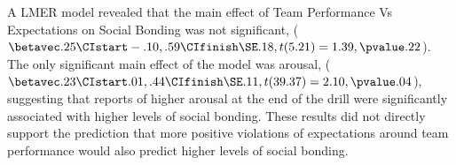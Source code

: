 \begin{CJK}{UTF8}{gbsn}

A LMER model revealed that the main effect of Team Performance Vs Expectations on Social Bonding was not significant, ($\betavec .25 \CIstart -.10, .59 \CIfinish \SE .18, t(5.21) = 1.39, \pvalue .22$).  The only significant main effect of the model was arousal, ($\betavec .23 \CIstart .01, .44 \CIfinish \SE .11, t(39.37) = 2.10, \pvalue .04$), suggesting that reports of higher arousal at the end of the drill were significantly associated with higher levels of social bonding.  These results did not directly support the prediction that more positive violations of expectations around team performance would also predict higher levels of social bonding.





\end{CJK}

